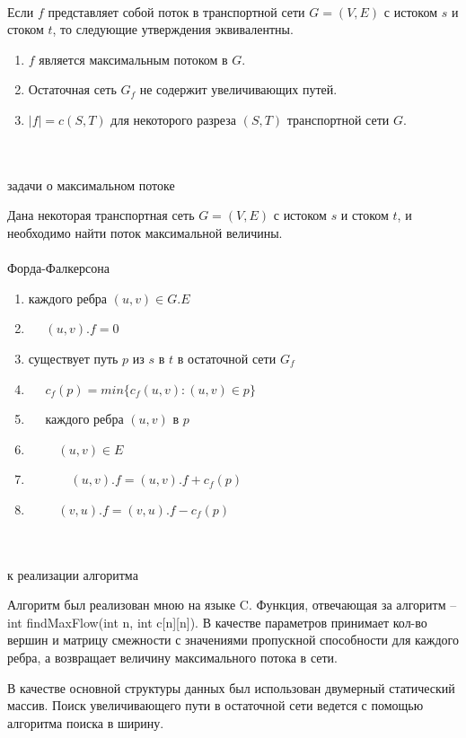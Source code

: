 \documentclass[12pt]{article}
\begin{document}
	~\\
	\par Если $f$ представляет собой поток в транспортной сети $G = (V, E)$ с истоком $s$ и стоком $t$, то следующие утверждения эквивалентны.
	\begin{enumerate}
		\item $f$ является максимальным потоком в $G$.
		\item Остаточная сеть $G_f$ не содержит увеличивающих путей.
		\item $|f| = c(S,T)$ для некоторого разреза $(S, T)$ транспортной сети $G$.
	\end{enumerate}
	~\\
	~\\
	{\large{ задачи о максимальном потоке}}
	~\\
	\par Дана некоторая транспортная сеть $G = (V,E)$ с истоком $s$ и стоком $t$, и необходимо найти поток максимальной величины.
	~\\
	~\\
	{\large{ Форда-Фалкерсона}}
	~\\
	\begin{enumerate}
		\item {} каждого ребра $(u,v) \in G.E$
		\item ~~ $ (u,v).f = 0$
		\item {} существует путь $p$ из $s$ в $t$ в остаточной сети $G_f$
		\item ~~ $c_f(p) = min\{c_f(u,v) : (u,v) \in p\}$
		\item ~~ {} каждого ребра $(u,v)$ в $p$
		\item ~~~~ {} $(u,v) \in E$
		\item ~~~~~~ $(u,v).f = (u,v).f + c_f(p)$
		\item ~~~~ {} $(v,u).f = (v,u).f - c_f(p)$
	\end{enumerate}
	~\\
	~\\
	{\large{ к реализации алгоритма}}
	~\\
	\par Алгоритм был реализован мною на языке C. Функция, отвечающая за алгоритм – int findMaxFlow(int n, int c[n][n]). В качестве параметров принимает кол-во вершин и матрицу смежности с значениями пропускной способности для каждого ребра, а возвращает величину максимального потока в сети.
	\par В качестве основной структуры данных был использован двумерный статический массив. Поиск увеличивающего пути в остаточной сети ведется с помощью алгоритма поиска в ширину.
\end{document}
